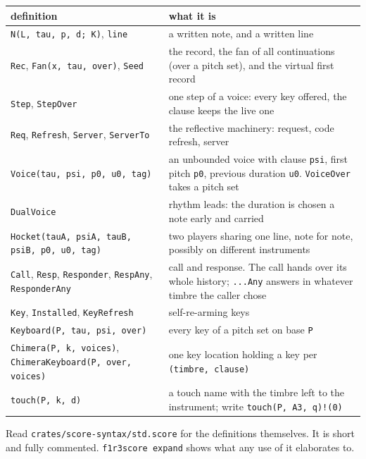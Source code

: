 \documentclass[11pt,a4paper]{article}
\newcommand{\ttx}[1]{\texttt{#1}}
\begin{document}
\begin{center}
\small
\begin{longtable}{@{}>{\raggedright\arraybackslash}p{5.3cm}>{\raggedright\arraybackslash}p{9.4cm}@{}}
\toprule
definition & what it is \\
\midrule
\endhead
\ttx{N(L, tau, p, d; K)}, \ttx{line} & a written note, and a written line \\
\ttx{Rec}, \ttx{Fan(x, tau, over)}, \ttx{Seed} & the record, the fan of all
  continuations (over a pitch set), and the virtual first record \\
\ttx{Step}, \ttx{StepOver} & one step of a voice: every key offered, the
  clause keeps the live one \\
\ttx{Req}, \ttx{Refresh}, \ttx{Server}, \ttx{ServerTo} & the reflective
  machinery: request, code refresh, server \\
\ttx{Voice(tau, psi, p0, u0, tag)} & an unbounded voice with clause
  \ttx{psi}, first pitch \ttx{p0}, previous duration \ttx{u0}. \ttx{VoiceOver}
  takes a pitch set \\
\ttx{DualVoice} & rhythm leads: the duration is chosen a note early and
  carried \\
\ttx{Hocket(tauA, psiA, tauB, psiB, p0, u0, tag)} & two players sharing one
  line, note for note, possibly on different instruments \\
\ttx{Call}, \ttx{Resp}, \ttx{Responder}, \ttx{RespAny}, \ttx{ResponderAny} &
  call and response. The call hands over its whole history; \ttx{...Any}
  answers in whatever timbre the caller chose \\
\ttx{Key}, \ttx{Installed}, \ttx{KeyRefresh} & self-re-arming keys \\
\ttx{Keyboard(P, tau, psi, over)} & every key of a pitch set on base \ttx{P} \\
\ttx{Chimera(P, k, voices)}, \ttx{ChimeraKeyboard(P, over, voices)} & one key
  location holding a key per \ttx{(timbre, clause)} \\
\ttx{touch(P, k, d)} & a touch name with the timbre left to the instrument;
  write \ttx{touch(P, A3, q)!(0)} \\
\bottomrule
\end{longtable}
\end{center}

\noindent Read \ttx{crates/score-syntax/std.score} for the definitions
themselves. It is short and fully commented. \ttx{f1r3score expand} shows what
any use of it elaborates to.

\end{document}
